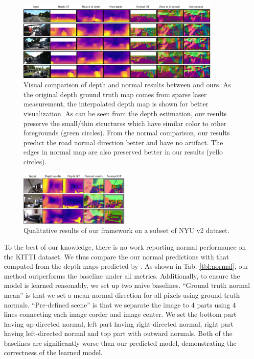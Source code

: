 \begin{figure}
\vspace{-0.5\baselineskip}
\centering
\includegraphics[width=0.9\textwidth]{figures/examples_7col_comp.pdf}
\caption{Visual comparison of depth and normal results between \protect\cite{zhou2017unsupervised} and ours. As the original depth ground truth map comes from sparse laser measurement, the interpolated depth map is shown for better visualization. As can be seen from the depth estimation, our results preserve the small/thin structures which have similar color to other foregrounds (green circles). From the normal comparison, our results predict the road normal direction better and have no artifact. The edges in normal map are also preserved better in our results (yello circles).}
\vspace{-1.0\baselineskip}
\label{fig:examples}
\end{figure}

\begin{figure}[h]
\centering
\includegraphics[width=0.5\textwidth]{figures/indoor_visual_comp.pdf}
\caption{Qualitative results of our framework on a subset of NYU v2 dataset.}
\vspace{-1.\baselineskip}
\label{fig:nyu_visual}
\end{figure}

To the best of our knowledge, there is no work reporting normal performance on the KITTI dataset. We thus compare the our normal predictions with that computed from the depth maps predicted by \cite{zhou2017unsupervised}. As shown in Tab. \ref{tbl:normal}, our method outperforms the baseline under all metrics. Additionally, to ensure the model is learned reasonably, we set up two naive baselines. ``Ground truth normal mean'' is that we set a mean normal direction for all pixels using ground truth normals. ``Pre-defined scene'' is that we separate the image to 4 parts using 4 lines connecting each image corder and image center. We set the bottom part having up-directed normal, left part having right-directed normal, right part having left-directed normal and top part with outward normals. Both of the baselines are significantly worse than our predicted model, demonstrating the correctness of the learned model.

